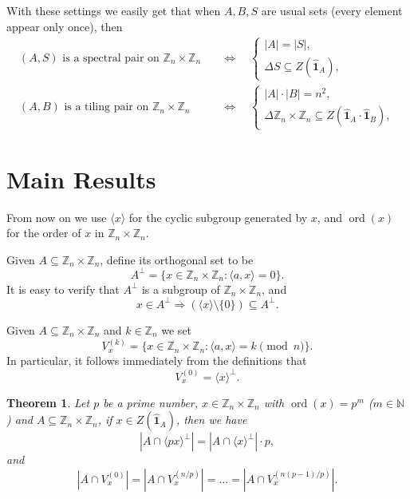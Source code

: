 \documentclass[A4, 11pt]{article}
\DeclareMathOperator{\ord}{ord}
\newcommand{\bra}[1]{\langle#1\rangle}
\newcommand{\G}[1]{\mathbb Z_{#1}\times\mathbb Z_{#1}}
\newcommand{\F}[1]{\widehat{\mathbf 1}_{#1}}
\newcommand{\Z}[1]{Z(\F{#1})}
\newtheorem{Thm}{Theorem}
\begin{document}
With these settings we easily get that when $A,B,S$ are usual sets (every element appear only once), then
\begin{align*}
(A,S) \text{ is a spectral pair on } \G{n} &\quad\Leftrightarrow\quad  \begin{cases}|A|=|S|, \\ \Delta S\subseteq \Z{A}, \end{cases} \\
(A,B) \text{ is a tiling pair on } \G{n} &\quad\Leftrightarrow\quad \begin{cases}|A|\cdot|B|=n^2, \\ \Delta\G{n}\subseteq Z(\F{A}\cdot\F{B}),\end{cases} 
\end{align*}
 
\section{Main Results}
From now on we use $\bra{x}$ for the cyclic subgroup generated by $x$, and $\ord(x)$ for the order of $x$ in $\G{n}$.

Given $A\subseteq \G{n}$, define its orthogonal set to be 
$$A^{\perp}=\{x\in\G{n}: \bra{a,x}=0\}.$$
It is easy to verify that $A^{\perp}$ is a subgroup of $\G{n}$, and 
$$x\in A^{\perp} \Rightarrow (\bra{x}\setminus\{0\}) \subseteq A^{\perp}.$$

Given $A\subseteq \G{n}$ and $k\in\mathbb Z_n$ we set
$$V_{x}^{(k)}=\{x\in\G{n}: \bra{a,x}=k \pmod n \}.$$
In particular, it follows immediately from the definitions that 
$$V_{x}^{(0)}=\bra{x}^{\perp}.$$

\begin{Thm} \label{ThmCount}
Let $p$ be a prime number, $x\in\G{n}$ with $\ord(x)=p^m$ ($m\in\mathbb N$) and $A\subseteq\G{n}$, if $x\in\Z{A}$, then we have
\begin{equation} \label{EqCount}
|A\cap\bra{px}^{\perp}|=|A\cap\bra{x}^{\perp}|\cdot p,
\end{equation}
and
\begin{equation} \label{EqEqui}
|A\cap V_{x}^{(0)}|=|A\cap V_{x}^{(n/p)}|=\ldots=|A\cap V_{x}^{(n(p-1)/p)}|.
\end{equation}
\end{Thm}
\end{document}
